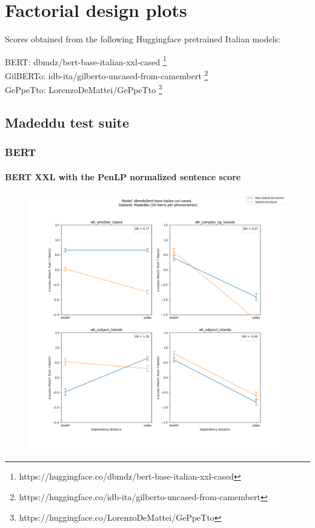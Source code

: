 \chapter{Factorial design plots}

Scores obtained from the following Huggingface pretrained Italian models:

BERT: dbmdz/bert-base-italian-xxl-cased \footnote{https://huggingface.co/dbmdz/bert-base-italian-xxl-cased} \\
GilBERTo: idb-ita/gilberto-uncased-from-camembert \footnote{https://huggingface.co/idb-ita/gilberto-uncased-from-camembert} \\
GePpeTto: LorenzoDeMattei/GePpeTto \citep{de2020geppetto} \footnote{https://huggingface.co/LorenzoDeMattei/GePpeTto} \\

\clearpage
\section{Madeddu test suite}

\subsection{BERT}
\subsubsection{BERT XXL with the PenLP normalized sentence score}
\begin{figure}[h]
	\centering
	\includegraphics[width=1\textwidth]{images/AppendixA/Madeddu_wh_dbmdz_bert-base-italian-xxl-cased_PenLP-zscores-likert-2022-09-14_h15m34s07.png} 
	\label{A-fig:md_bert_penlp}
	\caption{}
\end{figure}

